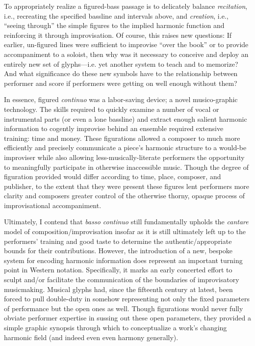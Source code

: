     To appropriately realize a figured-bass passage is to delicately balance \textit{recitation}, i.e., recreating the specified bassline and intervals above, and \textit{creation}, i.e., ``seeing through'' the simple figures to the implied harmonic function and reinforcing it through improvisation. Of course, this raises new questions: If earlier, un-figured lines were sufficient to improvise ``over the book'' or to provide accompaniment to a soloist, then why was it necessary to conceive and deploy an entirely new set of glyphs---i.e. yet another system to teach and to memorize? And what significance do these new symbols have to the relationship between performer and score if performers were getting on well enough without them? 
    
    In essence, figured \textit{continuo} was a labor-saving device; a novel musico-graphic technology. The skills required to quickly examine a number of vocal or instrumental parts (or even a lone bassline) and extract enough salient harmonic information to cogently improvise behind an ensemble required extensive training: time and money. These figurations allowed a composer to much more efficiently and precisely communicate a piece's harmonic structure to a would-be improviser while also allowing less-musically-literate performers the opportunity to meaningfully participate in otherwise inaccessible music. Though the degree of figuration provided would differ according to time, place, composer, and publisher, to the extent that they were present these figures lent performers more clarity and composers greater control of the otherwise thorny, opaque process of improvisational accompaniment.\autocite[321]{Kite-Powell_2012}

    Ultimately, I contend that \textit{basso continuo} still fundamentally upholds the \textit{cantare} model of composition/improvisation insofar as it is still ultimately left up to the performers' training and good taste to determine the authentic/appropriate bounds for their contributions. However, the introduction of a new, bespoke system for encoding harmonic information does represent an important turning point in Western notation. Specifically, it marks an early concerted effort to sculpt and/or facilitate the communication of the boundaries of improvisatory musicmaking. Musical glyphs had, since the fifteenth century at latest, been forced to pull double-duty in somehow representing not only the fixed parameters of performance but the open ones as well. Though figurations would never fully obviate performer expertise in sussing out these open parameters, they provided a simple graphic synopsis through which to conceptualize a work's changing harmonic field (and indeed even even harmony generally).
    
